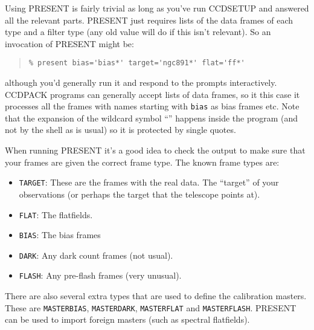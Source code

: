 \documentclass[twoside,11pt]{article}
\renewcommand{\_}{\texttt{\symbol{95}}}
\newenvironment{myquote}{\begin{quote}\begin{small}}{\end{small}\end{quote}}
\newcommand{\text}[1]{{\small \tt #1}}
\newcommand{\routine}[1]{{\sc #1}}
\begin{document}
Using \routine{PRESENT} is fairly trivial as long as you've
run \routine{CCDSETUP} and answered all the relevant parts.
\routine{PRESENT} just requires lists of the
data frames of each type and a filter type (any old value will do if this
isn't relevant). So an invocation of \routine{PRESENT} might be:
\begin{myquote}
\begin{verbatim}
% present bias='bias*' target='ngc891*' flat='ff*'
\end{verbatim}
\end{myquote}
although you'd generally run it and respond to the prompts
interactively. CCDPACK programs can generally accept lists of data
frames, so it this case it processes all the frames with names
starting with \text{bias} as bias frames etc. Note that the
expansion of the wildcard symbol ``\text{*}'' happens inside the program
(and not by the shell as is usual) so it is protected by single quotes.

When running \routine{PRESENT} it's a good idea to check the output to
make sure that your frames are given the correct frame type. The known frame
types are:
\begin{itemize}
\item \text{TARGET}: These are the frames with the real data. The
``target'' of your observations (or perhaps the target that the
telescope points at).
\item \text{FLAT}: The flatfields.
\item \text{BIAS}: The bias frames
\item \text{DARK}: Any dark count frames (not usual).
\item \text{FLASH}: Any pre-flash frames (very unusual).
\end{itemize}

There are also several extra types that are used to define the
calibration masters. These are \text{MASTER\_BIAS},
\text{MASTER\_DARK}, \text{MASTER\_FLAT} and \text{MASTER\_FLASH}.
\routine{PRESENT} can be used to import foreign masters (such as
spectral flatfields).
\end{document}
